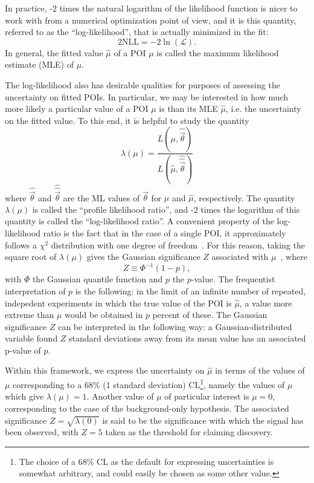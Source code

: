 In practice, -2 times the natural logarithm of the likelihood function is nicer to work with from a numerical optimization point of view, and it is this quantity, referred to as the ``log-likelihood'', that is actually minimized in the fit:
\begin{equation}
    2\text{NLL} = -2 \ln(\mathcal L).
\end{equation}
In general, the fitted value $\hat{\mu}$ of a POI $\mu$ is called the maximum likelihood estimate (MLE) of $\mu$.

The log-likelihood also has desirable qualities for purposes of assessing the uncertainty on fitted POIs.
In particular, we may be interested in how much more likely a particular value of a POI $\mu$ is than its MLE $\hat{\mu}$, i.e. the uncertainty on the fitted value.
To this end, it is helpful to study the quantity
\begin{equation} \label{eqn:tth_likelihood_ratio}
    \lambda(\mu) = \frac{L(\mu, \hat{\vec{\theta}})}{L(\hat{\mu}, \hat{\hat{\vec{\theta}}})}
\end{equation}
where $\hat{\vec{\theta}}$ and $\hat{\hat{\vec{\theta}}}$ are the ML values of $\vec{\theta}$ for $\mu$ and $\hat{\mu}$, respectively.
The quantity $\lambda(\mu)$ is called the ``profile likelihood ratio'', and -2 times the logarithm of this quantity is called the ``log-likelihood ratio''.
A convenient property of the log-likelihood ratio is the fact that in the case of a single POI, it approximately follows a $\chi^2$ distribution with one degree of freedom~\cite{Cowan:2010js}.
For this reason, taking the square root of $\lambda(\mu)$ gives the Gaussian significance $Z$ associated with $\mu$~\cite{Cowan:2010js}, where
\begin{equation}
    Z \equiv \Phi^{-1} (1 - p),
\end{equation}
with $\Phi$ the Gaussian quantile function and $p$ the $p$-value.
The frequentist interpretation of $p$ is the following: in the limit of an infinite number of repeated, indepedent experiments in which the true value of the POI is $\hat{\mu}$, a value more extreme than $\mu$ would be obtained in $p$ percent of these.
The Gaussian significance $Z$ can be interpreted in the following way: a Gaussian-distributed variable found $Z$ standard deviations away from its mean value has an associated p-value of $p$.

Within this framework, we express the uncertainty on $\hat{\mu}$ in terms of the values of $\mu$ corresponding to a 68\% (1 standard deviation) CL\footnote{The choice of a 68\% CL as the default for expressing uncertainties is somewhat arbitrary, and could easily be chosen as some other value.}, namely the values of $\mu$ which give $\lambda(\mu) = 1$.
Another value of $\mu$ of particular interest is $\mu = 0$, corresponding to the case of the background-only hypothesis.
The associated significance $Z = \sqrt{\lambda(0)}$ is said to be the significance with which the signal has been observed, with $Z=5$ taken as the threshold for claiming discovery.

